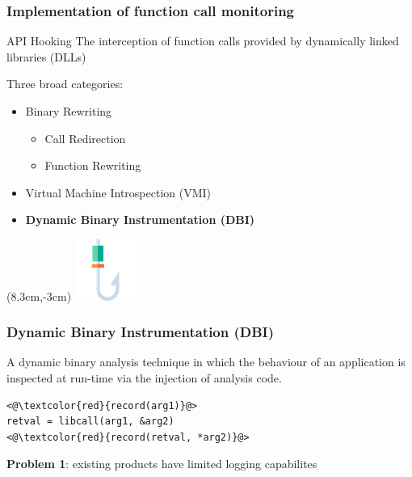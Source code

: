 \documentclass[compress]{beamer}
\begin{document}
\begin{frame}
    \frametitle{Implementation of function call monitoring}
	
	    \begin{beamerboxesrounded}[shadow=true]{API Hooking}
    The interception of function calls provided by dynamically
linked \\ libraries (DLLs)
    \end{beamerboxesrounded}
    \bigskip
	Three broad categories:    
    
    \begin{itemize}
    \item Binary Rewriting
    \begin{itemize}
    \item Call Redirection
    \item Function Rewriting
    \end{itemize}
    \item Virtual Machine Introspection (VMI)
    \item \textbf{Dynamic Binary Instrumentation (DBI)}
    \end{itemize}
    
    \begin{textblock*}{2cm}(8.3cm,-3cm)
   \includegraphics[width=2cm]{image/hook.png}%
	\end{textblock*} 

\end{frame}

\begin{frame}[fragile]
    \frametitle{Dynamic Binary Instrumentation (DBI)}
	
A dynamic binary analysis
technique in which the behaviour of an application is inspected at run-time via the
injection of analysis code. 
\bigskip
\begin{block}{}
\begin{lstlisting}[basicstyle=\ttfamily\large,xleftmargin=50pt]
<@\textcolor{red}{record(arg1)}@> 
retval = libcall(arg1, &arg2)
<@\textcolor{red}{record(retval, *arg2)}@> 
\end{lstlisting}
\end{block}
\bigskip
\bigskip
\textbf{Problem 1}: existing products have limited logging capabilites

\end{frame}
\end{document}
